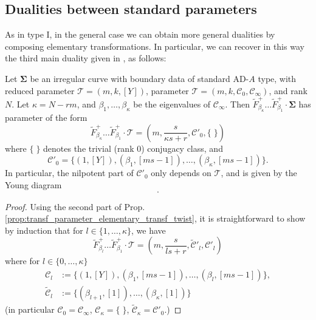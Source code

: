 \documentclass[11pt,a4paper]{amsart}
\numberwithin{equation}{section}
\begin{document}
\subsection{Dualities between standard parameters}

As in type I, in the general case we can obtain more general dualities by composing elementary transformations. In particular, we can recover in this way the third main duality given in \cite{beem2025simplifying}, as follows:

\begin{proposition}
\label{prop:duality_III_gen_case}
Let $\bm\Sigma$ be an irregular curve with boundary data of standard AD-$A$ type, with reduced parameter $\mathscr T=(m, k, [Y])$, parameter $\mathcal T=(m, k, \mathcal C_0, \mathcal C_\infty)$, and rank $N$. Let $\kappa=N-rm$, and $\beta_1, \dots, \beta_\kappa$ be the eigenvalues of $\mathcal C_\infty$. Then $\widetilde{F}^+_{\beta_\kappa}\dots\widetilde{F}^+_{\beta_1}\cdot \bm\Sigma$ has parameter of the form
\[
\widetilde{F}^+_{\beta_\kappa}\dots\widetilde{F}^+_{\beta_1}\cdot \mathcal T=\left(m, \frac{s}{\kappa s+r}, \mathcal C'_0, \{\;\}\right)
\]
where $\{\;\}$ denotes the trivial (rank 0) conjugacy class, and
\begin{equation}
{\mathcal  C}'_0 =\{(1, [Y]),(\beta_1,[ms-1]), \dots,(\beta_\kappa,[ms-1])\}.
\end{equation}
In particular, the nilpotent part of $\mathcal C'_0$ only depends on $\mathscr T$, and is given by the Young diagram
\begin{equation}
[(ms-1)^\kappa, Y].
\end{equation}
\end{proposition}

\begin{proof} Using the second part of Prop.  \ref{prop:transf_parameter_elementary_transf_twist}, it is straightforward to show by induction that for $l\in\{1, \dots, \kappa\}$, we have
\[
\widetilde{F}^+_{\beta_l}\dots\widetilde{F}^+_{\beta_1}\cdot \mathcal T=\left(m, \frac{s}{l s+r}, \widetilde{\mathscr C}'_l,\mathscr C'_l \right)
\]
where for $l\in \{0, \dots, \kappa\}$
\begin{align*}
{\mathscr  C}_l &:=\{(1, [Y]),(\beta_1,[ms-1]), \dots,(\beta_l,[ms-1])\},\\
\widetilde{\mathscr C}_l& :=\{(\beta_{l+1},[1]), \dots,(\beta_\kappa,[1])\}
\end{align*}
(in particular $\mathscr  C_0=\mathcal C_\infty$, $\mathscr  C_\kappa=\{\;\}$, $\widetilde{\mathscr C}_\kappa=\mathcal C'_0$.)
\end{proof}
\end{document}
